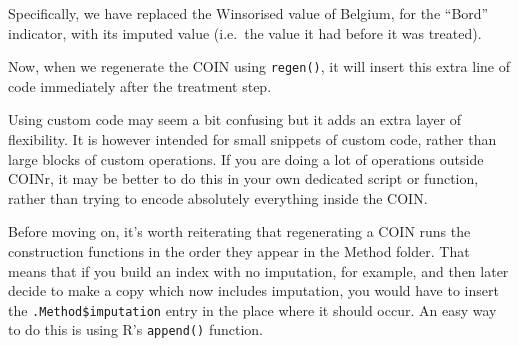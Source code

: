 \documentclass[
]{book}
\newenvironment{Shaded}{\begin{snugshade}}{\end{snugshade}}
\newcommand{\AlertTok}[1]{\textcolor[rgb]{0.94,0.16,0.16}{#1}}
\newcommand{\AttributeTok}[1]{\textcolor[rgb]{0.77,0.63,0.00}{#1}}
\newcommand{\CommentTok}[1]{\textcolor[rgb]{0.56,0.35,0.01}{\textit{#1}}}
\newcommand{\FunctionTok}[1]{\textcolor[rgb]{0.00,0.00,0.00}{#1}}
\newcommand{\NormalTok}[1]{#1}
\newcommand{\OtherTok}[1]{\textcolor[rgb]{0.56,0.35,0.01}{#1}}
\newcommand{\SpecialCharTok}[1]{\textcolor[rgb]{0.00,0.00,0.00}{#1}}
\newcommand{\StringTok}[1]{\textcolor[rgb]{0.31,0.60,0.02}{#1}}
\begin{document}
\begin{Shaded}
\end{Shaded}

Specifically, we have replaced the Winsorised value of Belgium, for the ``Bord'' indicator, with its imputed value (i.e.~the value it had before it was treated).

Now, when we regenerate the COIN using \texttt{regen()}, it will insert this extra line of code immediately after the treatment step.

Using custom code may seem a bit confusing but it adds an extra layer of flexibility. It is however intended for small snippets of custom code, rather than large blocks of custom operations. If you are doing a lot of operations outside COINr, it may be better to do this in your own dedicated script or function, rather than trying to encode absolutely everything inside the COIN.

Before moving on, it's worth reiterating that regenerating a COIN runs the construction functions in the order they appear in the Method folder. That means that if you build an index with no imputation, for example, and then later decide to make a copy which now includes imputation, you would have to insert the \texttt{.Method\$imputation} entry in the place where it should occur. An easy way to do this is using R's \texttt{append()} function.
\end{document}
